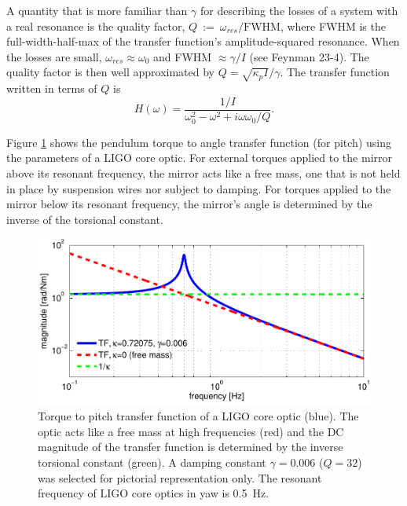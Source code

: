A quantity that is more familiar than $\gamma$ for describing the losses of a system with a real resonance is the quality factor, $Q~:=~\omega_{res}/\mathrm{FWHM}$, where FWHM is the full-width-half-max of the transfer function's amplitude-squared resonance. When the losses are small, $\omega_{res} \approx \omega_0$ and FWHM $\approx \gamma/I$ (see Feynman 23-4). The quality factor is then well approximated by $Q = \sqrt{\kappa_p I}/\gamma$. The transfer function written in terms of $Q$ is \begin{equation} H(\omega) = \frac{1/I}{\omega_0^2 - \omega^2 + i \omega \omega_0 / Q}.  \label{eq:TFpendulum} \end{equation}

Figure \ref{fig:pendTF} shows the pendulum torque to angle transfer
function (for pitch) using the parameters of a LIGO core optic. For
external torques applied to the mirror above its resonant frequency,
the mirror acts like a free mass, one that is not held in place by
suspension wires nor subject to damping. For torques applied to the
mirror below its resonant frequency, the mirror's angle is determined
by the inverse of the torsional constant.

\begin{figure}
\begin{centering}
\includegraphics[width=1.0\textwidth]{figures/pendTF.pdf}
\caption[Torque to pitch transfer function of a LIGO core
optic]{Torque to pitch transfer function of a LIGO core optic
  (blue). The optic acts like a free mass at high frequencies (red)
  and the DC magnitude of the transfer function is determined by the
  inverse torsional constant (green). A damping constant $\gamma =
  0.006$ ($Q=32$) was selected for pictorial representation only. The
  resonant frequency of LIGO core optics in yaw is 0.5~Hz.}
\label{fig:pendTF}
\end{centering}
\end{figure}





